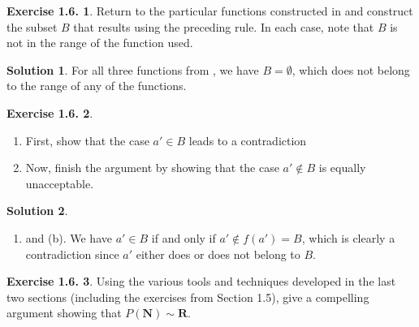 \documentclass[12pt]{article}
\theoremstyle{definition}
\theoremstyle{exercise}
\newtheorem{exercise}{Exercise 1.6.}
\theoremstyle{solution}
\newtheorem*{solution}{Solution}
\newcommand{\N}{\mathbf{N}}
\newcommand{\R}{\mathbf{R}}
\begin{document}
\begin{exercise}
\label{ex:7}
    Return to the particular functions constructed in  and construct the subset \( B \) that results using the preceding rule. In each case, note that \( B \) is not in the range of the function used.
\end{exercise}

\begin{solution}
    For all three functions from , we have \( B =  \emptyset \), which does not belong to the range of any of the functions.
\end{solution}

\begin{exercise}
\label{ex:8}
    \begin{enumerate}
        \item First, show that the case \( a' \in B \) leads to a contradiction

        \item Now, finish the argument by showing that the case \( a' \not\in B \) is equally unacceptable.
    \end{enumerate}
\end{exercise}

\begin{solution}
    \begin{enumerate}
        \item and (b). We have \( a' \in B \) if and only if \( a' \not\in f(a') = B \), which is clearly a contradiction since \( a' \) either does or does not belong to \( B \).
    \end{enumerate}
\end{solution}

\begin{exercise}
\label{ex:9}
    Using the various tools and techniques developed in the last two sections (including the exercises from Section 1.5), give a compelling argument showing that \( P(\N) \sim \R \).
\end{exercise}
\end{document}
